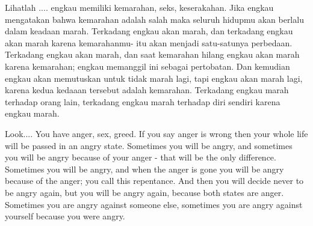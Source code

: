 \bahasa
Lihatlah .... engkau memiliki kemarahan, seks, keserakahan. Jika engkau mengatakan bahwa kemarahan adalah salah maka seluruh hidupmu akan berlalu dalam keadaan marah. Terkadang engkau akan marah, dan terkadang engkau akan marah karena kemarahanmu- itu akan menjadi satu-satunya perbedaan. Terkadang engkau akan marah, dan saat kemarahan hilang engkau akan marah karena kemarahan; engkau memanggil ini sebagai pertobatan. Dan kemudian engkau akan memutuskan untuk tidak marah lagi, tapi engkau akan marah lagi, karena kedua kedaaan tersebut adalah kemarahan. Terkadang engkau marah terhadap orang lain, terkadang engkau marah terhadap diri sendiri karena engkau marah.

\english
Look.... You have anger, sex, greed. If you say anger is wrong then your whole life will be passed in an angry state. Sometimes you will be angry, and sometimes you will be angry because of your anger - that will be the only difference. Sometimes you will be angry, and when the anger is gone you will be angry because of the anger; you call this repentance. And then you will decide never to be angry again, but you will be angry again, because both states are anger. Sometimes you are angry against someone else, sometimes you are angry against yourself because you were angry.


